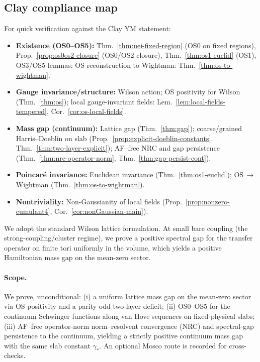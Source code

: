 \documentclass[11pt]{amsart}
\theoremstyle{plain}
\theoremstyle{definition}
\theoremstyle{remark}
\begin{document}
\subsection*{Clay compliance map}
For quick verification against the Clay YM statement:
\begin{itemize}
  \item \textbf{Existence (OS0--OS5):} Thm.~\ref{thm:uei-fixed-region} (OS0 on fixed regions), Prop.~\ref{prop:os0os2-closure} (OS0/OS2 closure), Thm.~\ref{thm:os1-euclid} (OS1), OS3/OS5 lemmas; OS reconstruction to Wightman: Thm.~\ref{thm:os-to-wightman}.
  \item \textbf{Gauge invariance/structure:} Wilson action; OS positivity for Wilson (Thm.~\ref{thm:os}); local gauge-invariant fields: Lem.~\ref{lem:local-fields-tempered}, Cor.~\ref{cor:os-local-fields}.
  \item \textbf{Mass gap (continuum):} Lattice gap (Thm.~\ref{thm:gap}); coarse/grained Harris--Doeblin on slab (Prop.~\ref{prop:explicit-doeblin-constants}, Thm.~\ref{thm:two-layer-explicit}); AF--free NRC and gap persistence (Thm.~\ref{thm:nrc-operator-norm}, Thm.~\ref{thm:gap-persist-cont}).
  \item \textbf{Poincar\'e invariance:} Euclidean invariance (Thm.~\ref{thm:os1-euclid}); OS\,$\to$\,Wightman (Thm.~\ref{thm:os-to-wightman}).
  \item \textbf{Nontriviality:} Non-Gaussianity of local fields (Prop.~\ref{prop:nonzero-cumulant4}, Cor.~\ref{cor:nonGaussian-main}).
\end{itemize}

We adopt the standard Wilson lattice formulation. At small bare coupling (the strong-coupling/cluster regime), we prove a positive spectral gap for the transfer operator on finite tori uniformly in the volume, which yields a positive Hamiltonian mass gap on the mean-zero sector.

\paragraph{Scope.}
We prove, unconditional: (i) a uniform lattice mass gap on the mean-zero sector via OS positivity and a parity-odd two-layer deficit; (ii) OS0--OS5 for the continuum Schwinger functions along van Hove sequences on fixed physical slabs; (iii) AF--free operator-norm norm--resolvent convergence (NRC) and spectral-gap persistence to the continuum, yielding a strictly positive continuum mass gap with the same slab constant $\gamma_*$. An optional Mosco route is recorded for cross-checks.
\end{document}
